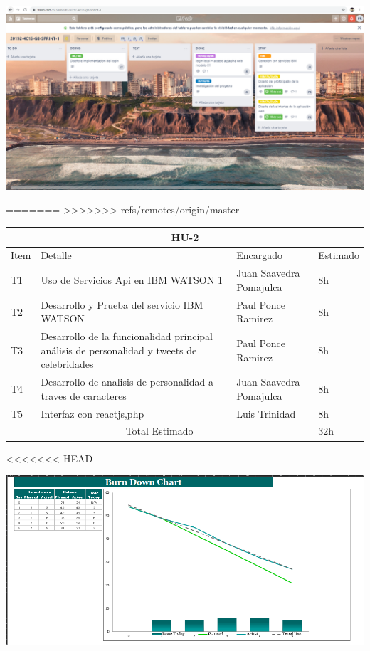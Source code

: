 \centering
\includegraphics[width=1.20\textwidth]{img/image}\par\vspace{1cm}
\vspace{0.30cm}	



=======
>>>>>>> refs/remotes/origin/master

\begin{table}[htbp]
	\begin{center}
		\begin{tabular}{| p{0.7cm} | p{10cm} | p{3.2cm} | p{1.8cm}|}
			\hline
			\multicolumn{4}{|c|}{HU-2}\\
			\hline
			Item & Detalle & Encargado & Estimado \\
			\hline
			T1 &Uso de Servicios Api en IBM WATSON 1 & Juan Saavedra Pomajulca & 8h \\
			\hline
			T2 &Desarrollo y Prueba del servicio IBM WATSON & Paul Ponce Ramirez & 8h \\
			\hline
			T3 & Desarrollo de la funcionalidad principal análisis de personalidad y tweets de celebridades & Paul Ponce Ramirez & 8h \\
			\hline
			T4 & Desarrollo de analisis de personalidad a traves de caracteres & Juan Saavedra Pomajulca & 8h \\
			\hline
			T5 & Interfaz con reactjs,php & Luis Trinidad & 8h \\
			\hline
			\multicolumn{3}{|c|}{Total Estimado} & 32h\\
			\hline
		\end{tabular}
	\end{center}
\end{table}
<<<<<<< HEAD

\centering
\includegraphics[width=1.20\textwidth]{img/burnt2}\par\vspace{1cm}
\vspace{0.30cm}	



